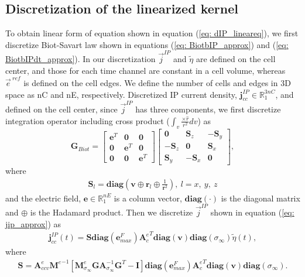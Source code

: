 \documentclass[a4paper, 11pt]{article}
\newcommand{\siginf}{\sigma_\infty}
\newcommand{\Ace}{{\mathbf A_c^e}}
\newcommand{\diag}{\mathbf{diag}}
\newcommand{\M}{{\mathbf M}}
\newcommand{\MeSigInf}{{\M^e_{\sigma_\infty}}}
\newcommand{\Me}{{\M^e}}
\renewcommand {\j}  { {\vec j} }
\newcommand {\e}  { {\vec e} }
\renewcommand {\dj}  { {\mathbf{j} } }
\newcommand {\de}  { {\mathbf{e} } }
\newcommand{\vol}{\mathbf{v}}
\newcommand{\A}{\mathbf{A}}
\newcommand{\peta}{\tilde{\eta}}
\newcommand{\eref}{\e^{\ ref}}
\begin{document}
\subsection{Discretization of the linearized kernel}
\label{section:linearkernel_discrete}
To obtain linear form of equation shown in equation (\ref{eq: dIP_lineareq}),
we first discretize Biot-Savart law shown in equations (\ref{eq: BiotbIP_approx}) and (\ref{eq: BiotbIPdt_approx}). In our discretization $\j^{IP}$ and  $\peta$ are defined on the cell center, and those for each time channel are constant in a cell volume, whereas $\eref$ is defined on the cell edges. 
We define the number of cells and edges in 3D space as nC and nE, respectively. Discretized IP current density, $\dj^{IP}_{cc} \in \mathbb{R}^{3nC}_{1}$, and defined on the cell center, since $\j^{IP}$ has three components, we first discretize integration operator including cross product ($\int_{v}\frac{ \times \hat{r}}{r^2}dv$) as
\begin{equation}
  \mathbf{G}_{Biot} =
  \begin{bmatrix}
       \mathbf{e}^T &  \mathbf{0}   & \mathbf{0}  \\
       \mathbf{0}   &  \mathbf{e}^T & \mathbf{0}  \\
       \mathbf{0}   &  \mathbf{0}   & \mathbf{e}^T
    \end{bmatrix}
  \begin{bmatrix}
       \mathbf{0}     &   \mathbf{S}_z   & -\mathbf{S}_y  \\
      -\mathbf{S}_z   &   \mathbf{0}     &  \mathbf{S}_x  \\
       \mathbf{S}_y   &  -\mathbf{S}_x   &  \mathbf{0}
    \end{bmatrix},
 \end{equation}
where
\begin{eqnarray*}
  \mathbf{S}_l =\diag(\mathbf{v}\oplus \mathbf{r}_l \oplus \frac{1}{\mathbf{r}^2}), \ l = x, \ y, \ z
\end{eqnarray*}
and the electric field, $\mathbf{e} \in \mathbb{R}^{nE}_1$ is a column vector, $\diag(\cdot)$ is the diagonal matrix and $\oplus$ is the Hadamard product. 
Then we discretize $\j^{IP}$ shown in equation (\ref{eq: jip_approx}) as
\begin{eqnarray}
  \dj^{IP}_{cc}(t) = \mathbf{S}\diag(\de^{F}_{max})\Ace^T\diag(\vol)\diag(\siginf)\peta(t),
\end{eqnarray}
where
\begin{eqnarray}
  \mathbf{S} = \mathbf{A}^{e}_{ccv}\Me^{-1}[\MeSigInf \mathbf{G} \A_{\siginf}^{-1}\mathbf{G}^T  - \mathbf{I}] \diag(\de^{F}_{max})\Ace^T\diag(\vol)\diag(\siginf).
\end{eqnarray}
\end{document}
